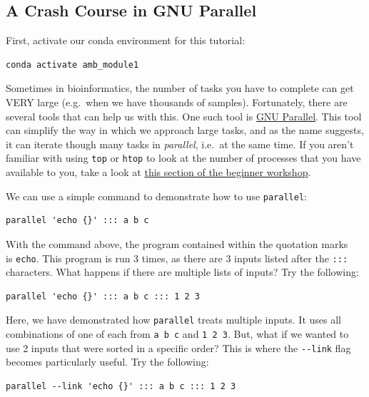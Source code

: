 \documentclass[
]{book}
\begin{document}
\subsection{A Crash Course in GNU Parallel}\label{a-crash-course-in-gnu-parallel}

First, activate our conda environment for this tutorial:

\begin{verbatim}
conda activate amb_module1
\end{verbatim}

Sometimes in bioinformatics, the number of tasks you have to complete can get VERY large (e.g.~when we have thousands of samples). Fortunately, there are several tools that can help us with this. One such tool is \href{https://www.gnu.org/software/parallel/parallel_tutorial.html}{GNU Parallel}. This tool can simplify the way in which we approach large tasks, and as the name suggests, it can iterate though many tasks in \emph{parallel}, i.e.~at the same time. If you aren't familiar with using \texttt{top} or \texttt{htop} to look at the number of processes that you have available to you, take a look at \href{https://bioinformaticsdotca.github.io/BMB_2025/module-1.html\#htop---looking-at-the-number-of-processes-we-have-available-or-running}{this section of the beginner workshop}.

We can use a simple command to demonstrate how to use \texttt{parallel}:

\begin{verbatim}
parallel 'echo {}' ::: a b c
\end{verbatim}

With the command above, the program contained within the quotation marks \texttt{\textquotesingle{}\ \textquotesingle{}} is \texttt{echo}. This program is run 3 times, as there are 3 inputs listed after the \texttt{:::} characters. What happens if there are multiple lists of inputs? Try the following:

\begin{verbatim}
parallel 'echo {}' ::: a b c ::: 1 2 3
\end{verbatim}

Here, we have demonstrated how \texttt{parallel} treats multiple inputs. It uses all combinations of one of each from \texttt{a\ b\ c} and \texttt{1\ 2\ 3}. But, what if we wanted to use 2 inputs that were sorted in a specific order? This is where the \texttt{-\/-link} flag becomes particularly useful. Try the following:

\begin{verbatim}
parallel --link 'echo {}' ::: a b c ::: 1 2 3
\end{verbatim}
\end{document}
